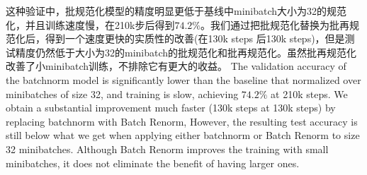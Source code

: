 这种验证中，批规范化模型的精度明显更低于基线中minibatch大小为32的规范化，并且训练速度慢，在210k步后得到$74.2\%$。我们通过把批规范化替换为批再规范化后，得到一个速度更快的实质性的改善(在130k steps 后130k steps)，但是测试精度仍然低于大小为32的minibatch的批规范化和批再规范化。虽然批再规范化改善了小minibatch训练，不排除它有更大的收益。
The validation accuracy of the batchnorm model is significantly lower than the baseline that normalized over minibatches of size 32, and training is slow, achieving $74.2\%$ at 210k steps. We obtain a substantial improvement much faster (130k steps at 130k steps) by replacing batchnorm with Batch Renorm, However, the resulting test accuracy is still below what we get when applying either batchnorm or Batch Renorm to size 32 minibatches. Although Batch Renorm improves the training with small minibatches, it does not eliminate the benefit of having larger ones.




